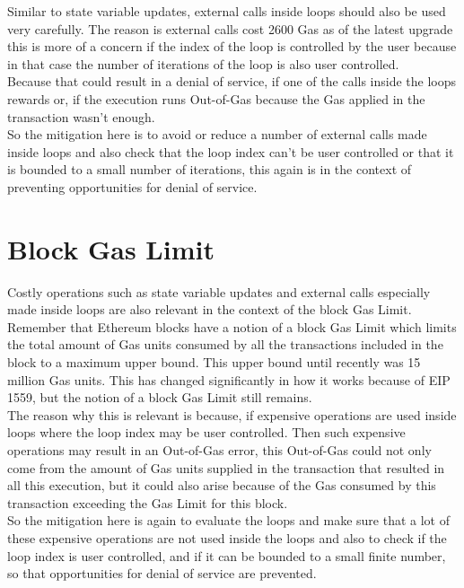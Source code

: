 Similar to state variable updates, external calls inside loops should also be used very carefully. The reason is external calls cost 2600 Gas as of the latest upgrade this is more of a concern if the index of the loop is controlled by the user because in that case the number of iterations of the loop is also user controlled.\\

Because that could result in a denial of service, if one of the calls inside the loops rewards or, if the execution runs Out-of-Gas because the Gas applied in the transaction wasn't enough.\\

So the mitigation here is to avoid or reduce a number of external calls made inside loops and also check that the loop index can't be user controlled or that it is bounded to a small number of iterations, this again is in the context of preventing opportunities for denial of service.

\section{Block Gas Limit}

Costly operations such as state variable updates and external calls especially made inside loops are also relevant in the context of the block Gas Limit.\\

Remember that Ethereum blocks have a notion of a block Gas Limit which limits the total amount of Gas units consumed by all the transactions included in the block to a maximum upper bound. This upper bound until recently was 15 million Gas units. This has changed significantly in how it works because of EIP 1559, but the notion of a block Gas Limit still remains.\\

The reason why this is relevant is because, if expensive operations are used inside loops where the loop index may be user controlled. Then such expensive operations may result in an Out-of-Gas error, this Out-of-Gas could not only come from the amount of Gas units supplied in the transaction that resulted in all this execution, but it could also arise because of the Gas consumed by this transaction exceeding the Gas Limit for this block.\\

So the mitigation here is again to evaluate the loops and make sure that a lot of these expensive operations are not used inside the loops and also to check if the loop index is user controlled, and if it can be bounded to a small finite number, so that opportunities for denial of service are prevented.


